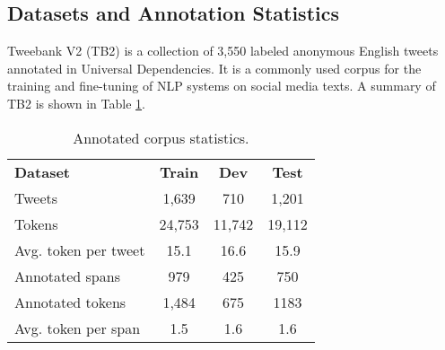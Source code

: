 \documentclass[10pt, a4paper]{article}
\begin{document}
\subsection{Datasets and Annotation Statistics}
Tweebank V2 (TB2) \cite{kong2014dependency,liu2018parsing}is a collection of 3,550 labeled anonymous English tweets annotated in Universal Dependencies. It is a commonly used corpus for the training and fine-tuning of NLP systems on social media texts.  A summary of TB2 is shown in Table \ref{tab:stats}.


\begin{table}[!ht]
\centering
\begin{tabular}{l|ccc}
\textbf{Dataset}& \textbf{Train} & \textbf{Dev} & \textbf{Test}\\ \Xhline{2\arrayrulewidth}
Tweets & 1,639 & 710 & 1,201 \\
Tokens& 24,753 & 11,742 & 19,112\\
Avg. token per tweet& 15.1 & 16.6 & 15.9 \\
Annotated spans & 979 & 425 & 750 \\ 
Annotated tokens& 1,484 & 675 & 1183\\ 
Avg. token per span & 1.5 & 1.6 & 1.6\\ 
\end{tabular}
\caption{Annotated corpus statistics.}
\label{tab:stats}
\end{table}
\end{document}
